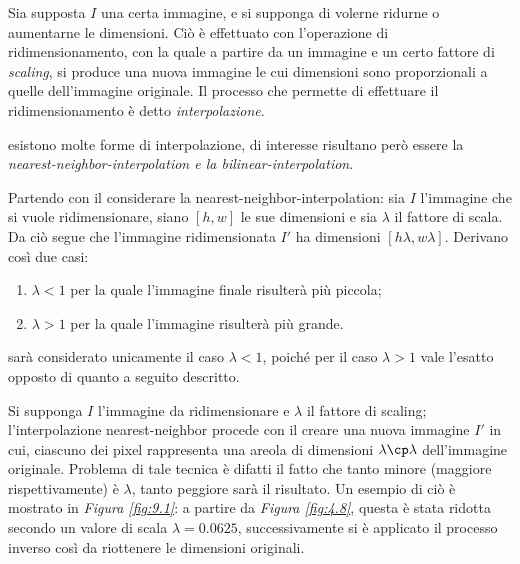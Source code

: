 \documentclass{subfiles}
\begin{document}
Sia supposta \(I\) una certa immagine, e si supponga di volerne ridurne o aumentarne le dimensioni.
Ciò è effettuato con l'operazione di ridimensionamento, con la quale a partire da un immagine e un certo fattore di \emph{scaling},
si produce una nuova immagine le cui dimensioni sono proporzionali a quelle dell'immagine originale.
Il processo che permette di effettuare il ridimensionamento è detto \emph{interpolazione}.

\begin{Note*}
    esistono molte forme di interpolazione, di interesse risultano però essere la \emph{nearest-neighbor-interpolation \emph{e la} bilinear-interpolation}.
\end{Note*}

Partendo con il considerare la nearest-neighbor-interpolation: sia \(I\) l'immagine che si vuole ridimensionare,
siano \([h, w]\) le sue dimensioni e sia \(\lambda\) il fattore di scala. Da ciò segue che l'immagine ridimensionata \(I'\) ha dimensioni \([h\lambda, w\lambda]\).
Derivano così due casi:
\begin{enumerate}
    \item \(\lambda < 1\) per la quale l'immagine finale risulterà più piccola;
    \item \(\lambda > 1\) per la quale l'immagine risulterà più grande.
\end{enumerate}

\begin{Note*}
    sarà considerato unicamente il caso \(\lambda < 1\), poiché per il caso \(\lambda > 1\) vale l'esatto opposto di quanto a seguito descritto.
\end{Note*}

Si supponga \(I\) l'immagine da ridimensionare e \(\lambda\) il fattore di scaling; l'interpolazione nearest-neighbor procede con il creare una nuova immagine \(I'\) in cui,
ciascuno dei pixel rappresenta una areola di dimensioni \(\lambda \cp \lambda\) dell'immagine originale.
Problema di tale tecnica è difatti il fatto che tanto minore (maggiore rispettivamente) è \(\lambda\), tanto peggiore sarà il risultato.
Un esempio di ciò è mostrato in \emph{Figura \ref{fig:9.1}}: a partire da \emph{Figura \ref{fig:4.8}}, questa è stata ridotta secondo un valore di scala \(\lambda = 0.0625\),
successivamente si è applicato il processo inverso così da riottenere le dimensioni originali.

\end{document}
